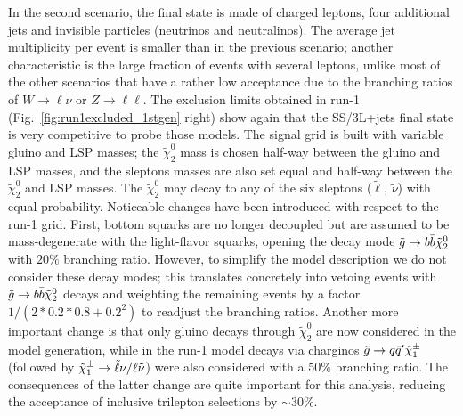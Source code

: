 
In the second scenario, the final state is made of charged leptons, 
four additional jets and invisible particles (neutrinos and neutralinos). 
The average jet multiplicity per event is smaller than in the previous scenario; 
another characteristic is the large fraction of events with several leptons, 
unlike most of the other scenarios that have a rather low acceptance due to the branching ratios of $W\to\ell\nu$ or $Z\to\ell\ell$. 
The exclusion limits obtained in run-1 (Fig.~\ref{fig:run1excluded_1stgen} right) show again that the SS/3L+jets final state 
is very competitive to probe those models. 
The signal grid is built with variable gluino and LSP masses; the $\tilde{\chi}_{2}^{0}$ mass is chosen half-way between the gluino and LSP masses, 
and the sleptons masses are also set equal and half-way between the $\tilde{\chi}_{2}^{0}$ and LSP masses. 
The $\tilde{\chi}_{2}^{0}$ may decay to any of the six sleptons ($\tilde\ell$, $\tilde\nu$) with equal probability. 
Noticeable changes have been introduced with respect to the run-1 grid. 
First, bottom squarks are no longer decoupled but are assumed to be mass-degenerate with the light-flavor squarks, 
opening the decay mode $\tilde{g}\to b\bar b\tilde\chi_2^0$ with $20\%$ branching ratio. 
However, to simplify the model description we do not consider these decay modes; 
this translates concretely into vetoing events with $\tilde{g}\to b\bar b\tilde\chi_2^0$ decays 
and weighting the remaining events by a factor $1/(2*0.2*0.8+0.2^2)$ to readjust the branching ratios. 
Another more important change is that only gluino decays through $\tilde{\chi}_{2}^{0}$ are now considered in the model generation, 
while in the run-1 model decays via charginos $\tilde{g}\to q\bar q'\tilde{\chi}_{1}^{\pm}$ (followed by $\tilde{\chi}_{1}^{\pm}\to\tilde\ell\nu/\ell\tilde\nu$) 
were also considered with a $50\%$ branching ratio. 
The consequences of the latter change are quite important for this analysis, 
reducing the acceptance of inclusive trilepton selections by $\sim 30\%$.  

